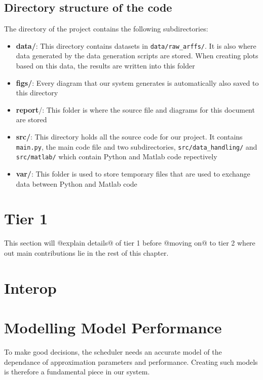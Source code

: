 \documentclass[a4paper,12pt,twoside,openright]{report}
\begin{document}

\subsection{Directory structure of the code}

The directory of the project contains the following subdirectories:
\begin{itemize}
\item \textbf{data/}: This directory contains datasets in \texttt{data/raw\_arffs/}. It is also where data generated by the data generation scripts are stored. When creating plots based on this data, the results are written into this folder
\item \textbf{figs/}: Every diagram that our system generates is automatically also saved to this directory
\item \textbf{report}/: This folder is where the source file and diagrams for this document are stored
\item \textbf{src/}: This directory holds all the source code for our project. It contains \texttt{main.py}, the main code file and two subdirectories, \texttt{src/data\_handling/} and \texttt{src/matlab/} which contain Python and Matlab code repectively
\item \textbf{var/}: This folder is used to store temporary files that are used to exchange data between Python and Matlab code
\end{itemize}

\section{Tier 1}
This section will @explain details@ of tier 1 before @moving on@ to tier 2 where out main contributions lie in the rest of this chapter.

\section{Interop} %


\section{Modelling Model Performance}
To make good decisions, the scheduler needs an accurate model of the dependance of approximation parameters and performance. Creating such models is therefore a fundamental piece in our system.
\end{document}
